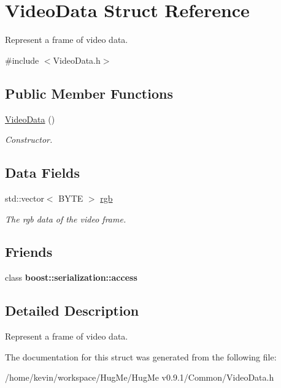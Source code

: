 \hypertarget{structVideoData}{
\section{VideoData Struct Reference}
\label{structVideoData}
}


Represent a frame of video data.  




{\ttfamily \#include $<$VideoData.h$>$}

\subsection*{Public Member Functions}
\begin{DoxyCompactItemize}
\item 
\hypertarget{structVideoData_a7c88e65a45b7373bab553cc6321f06ab}{
\hyperlink{structVideoData_a7c88e65a45b7373bab553cc6321f06ab}{VideoData} ()}
\label{structVideoData_a7c88e65a45b7373bab553cc6321f06ab}

\begin{DoxyCompactList}\small\item\em Constructor. \item\end{DoxyCompactList}\end{DoxyCompactItemize}
\subsection*{Data Fields}
\begin{DoxyCompactItemize}
\item 
\hypertarget{structVideoData_a5f6935b6a9d244c18ce5e3165e2fe6b4}{
std::vector$<$ BYTE $>$ \hyperlink{structVideoData_a5f6935b6a9d244c18ce5e3165e2fe6b4}{rgb}}
\label{structVideoData_a5f6935b6a9d244c18ce5e3165e2fe6b4}

\begin{DoxyCompactList}\small\item\em The rgb data of the video frame. \item\end{DoxyCompactList}\end{DoxyCompactItemize}
\subsection*{Friends}
\begin{DoxyCompactItemize}
\item 
\hypertarget{structVideoData_ac98d07dd8f7b70e16ccb9a01abf56b9c}{
class {\bfseries boost::serialization::access}}
\label{structVideoData_ac98d07dd8f7b70e16ccb9a01abf56b9c}

\end{DoxyCompactItemize}


\subsection{Detailed Description}
Represent a frame of video data. 

The documentation for this struct was generated from the following file:\begin{DoxyCompactItemize}
\item 
/home/kevin/workspace/HugMe/HugMe v0.9.1/Common/VideoData.h\end{DoxyCompactItemize}
